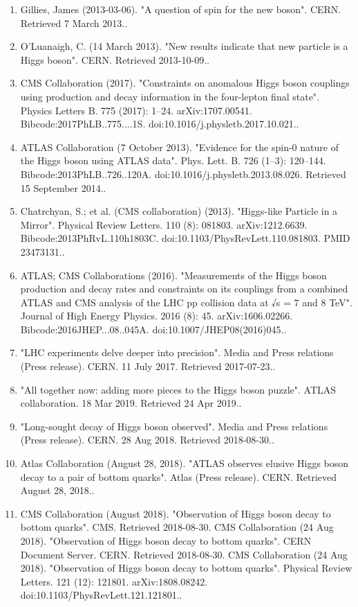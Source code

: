\begin{enumerate}
    \item Gillies, James (2013-03-06). "A question of spin for the new boson". CERN. Retrieved 7 March 2013..
    \item O'Luanaigh, C. (14 March 2013). "New results indicate that new particle is a Higgs boson". CERN. Retrieved 2013-10-09..
    \item CMS Collaboration (2017). "Constraints on anomalous Higgs boson couplings using production and decay information in the four-lepton final state". Physics Letters B. 775 (2017): 1–24. arXiv:1707.00541. Bibcode:2017PhLB..775....1S. doi:10.1016/j.physletb.2017.10.021..
    \item ATLAS Collaboration (7 October 2013). "Evidence for the spin-0 nature of the Higgs boson using ATLAS data". Phys. Lett. B. 726 (1–3): 120–144. Bibcode:2013PhLB..726..120A. doi:10.1016/j.physletb.2013.08.026. Retrieved 15 September 2014..
    \item Chatrchyan, S.; et al. (CMS collaboration) (2013). "Higgs-like Particle in a Mirror". Physical Review Letters. 110 (8): 081803. arXiv:1212.6639. Bibcode:2013PhRvL.110h1803C. doi:10.1103/PhysRevLett.110.081803. PMID 23473131..
    \item ATLAS; CMS Collaborations (2016). "Measurements of the Higgs boson production and decay rates and constraints on its couplings from a combined ATLAS and CMS analysis of the LHC pp collision data at √s = 7 and 8 TeV". Journal of High Energy Physics. 2016 (8): 45. arXiv:1606.02266. Bibcode:2016JHEP...08..045A. doi:10.1007/JHEP08(2016)045..
    \item "LHC experiments delve deeper into precision". Media and Press relations (Press release). CERN. 11 July 2017. Retrieved 2017-07-23..
    \item "All together now: adding more pieces to the Higgs boson puzzle". ATLAS collaboration. 18 Mar 2019. Retrieved 24 Apr 2019..
    \item "Long-sought decay of Higgs boson observed". Media and Press relations (Press release). CERN. 28 Aug 2018. Retrieved 2018-08-30..
    \item Atlas Collaboration (August 28, 2018). "ATLAS observes elusive Higgs boson decay to a pair of bottom quarks". Atlas (Press release). CERN. Retrieved August 28, 2018..
    \item CMS Collaboration (August 2018). "Observation of Higgs boson decay to bottom quarks". CMS. Retrieved 2018-08-30. CMS Collaboration (24 Aug 2018). "Observation of Higgs boson decay to bottom quarks". CERN Document Server. CERN. Retrieved 2018-08-30. CMS Collaboration (24 Aug 2018). "Observation of Higgs boson decay to bottom quarks". Physical Review Letters. 121 (12): 121801. arXiv:1808.08242. doi:10.1103/PhysRevLett.121.121801..

\end{enumerate}
